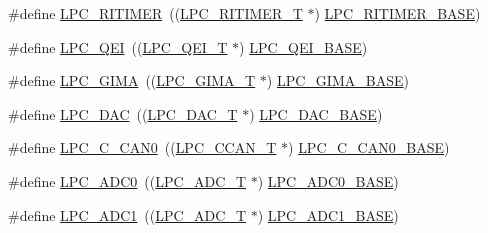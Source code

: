 \begin{DoxyCompactItemize}
\item 
\#define \hyperlink{group___p_e_r_i_p_h__18_x_x___b_a_s_e_gadf02cb70e7eb1a9e85e2b84ec1537fee}{L\+P\+C\+\_\+\+R\+I\+T\+I\+M\+ER}~((\hyperlink{struct_l_p_c___r_i_t_i_m_e_r___t}{L\+P\+C\+\_\+\+R\+I\+T\+I\+M\+E\+R\+\_\+T}          $\ast$) \hyperlink{group___p_e_r_i_p_h__43_x_x___b_a_s_e_ga37e5300b78c57ef9d338291e79610971}{L\+P\+C\+\_\+\+R\+I\+T\+I\+M\+E\+R\+\_\+\+B\+A\+SE})
\item 
\#define \hyperlink{group___p_e_r_i_p_h__18_x_x___b_a_s_e_ga71347b58898f54f8e9f00a6c652c7d49}{L\+P\+C\+\_\+\+Q\+EI}~((\hyperlink{struct_l_p_c___q_e_i___t}{L\+P\+C\+\_\+\+Q\+E\+I\+\_\+T}              $\ast$) \hyperlink{group___p_e_r_i_p_h__43_x_x___b_a_s_e_ga80fa25b18324c10c8e5c26893e6f0a67}{L\+P\+C\+\_\+\+Q\+E\+I\+\_\+\+B\+A\+SE})
\item 
\#define \hyperlink{group___p_e_r_i_p_h__18_x_x___b_a_s_e_ga7f38efebba36596b031c3ca454a05344}{L\+P\+C\+\_\+\+G\+I\+MA}~((\hyperlink{struct_l_p_c___g_i_m_a___t}{L\+P\+C\+\_\+\+G\+I\+M\+A\+\_\+T}             $\ast$) \hyperlink{group___p_e_r_i_p_h__43_x_x___b_a_s_e_ga487598b990a1a910e078773fb461a9f9}{L\+P\+C\+\_\+\+G\+I\+M\+A\+\_\+\+B\+A\+SE})
\item 
\#define \hyperlink{group___p_e_r_i_p_h__18_x_x___b_a_s_e_ga5b94918e9ea326d84ab862a5d377903b}{L\+P\+C\+\_\+\+D\+AC}~((\hyperlink{struct_l_p_c___d_a_c___t}{L\+P\+C\+\_\+\+D\+A\+C\+\_\+T}              $\ast$) \hyperlink{group___p_e_r_i_p_h__43_x_x___b_a_s_e_ga3bbaedad584252212d4704bb419489f6}{L\+P\+C\+\_\+\+D\+A\+C\+\_\+\+B\+A\+SE})
\item 
\#define \hyperlink{group___p_e_r_i_p_h__18_x_x___b_a_s_e_ga0bbe56baee5457d261e664903772406a}{L\+P\+C\+\_\+\+C\+\_\+\+C\+A\+N0}~((\hyperlink{struct_l_p_c___c_c_a_n___t}{L\+P\+C\+\_\+\+C\+C\+A\+N\+\_\+T}             $\ast$) \hyperlink{group___p_e_r_i_p_h__43_x_x___b_a_s_e_gad8ad25cb93a229d94ba1de367cbb1fa3}{L\+P\+C\+\_\+\+C\+\_\+\+C\+A\+N0\+\_\+\+B\+A\+SE})
\item 
\#define \hyperlink{group___p_e_r_i_p_h__18_x_x___b_a_s_e_gabbf7aa3d208a94071e0315856398a6cd}{L\+P\+C\+\_\+\+A\+D\+C0}~((\hyperlink{struct_l_p_c___a_d_c___t}{L\+P\+C\+\_\+\+A\+D\+C\+\_\+T}              $\ast$) \hyperlink{group___p_e_r_i_p_h__43_x_x___b_a_s_e_gaeab1b71ab377bf49f50db80ea0c618a8}{L\+P\+C\+\_\+\+A\+D\+C0\+\_\+\+B\+A\+SE})
\item 
\#define \hyperlink{group___p_e_r_i_p_h__18_x_x___b_a_s_e_gab6013140dd1f4ffdd1575ce747f8bb2b}{L\+P\+C\+\_\+\+A\+D\+C1}~((\hyperlink{struct_l_p_c___a_d_c___t}{L\+P\+C\+\_\+\+A\+D\+C\+\_\+T}              $\ast$) \hyperlink{group___p_e_r_i_p_h__43_x_x___b_a_s_e_ga87b2b5b070b1fa91cf2f2bf243420e7d}{L\+P\+C\+\_\+\+A\+D\+C1\+\_\+\+B\+A\+SE})

\end{DoxyCompactItemize}
